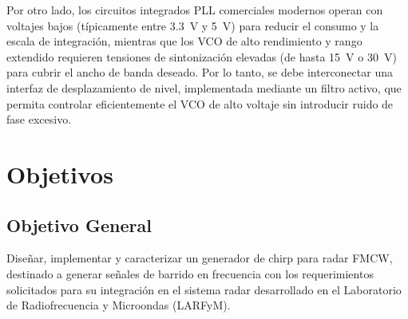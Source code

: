 Por otro lado, los circuitos integrados PLL comerciales modernos operan con voltajes bajos (típicamente entre 3.3~V y 5~V) para reducir el consumo y la escala de integración, mientras que los VCO de alto rendimiento y rango extendido requieren tensiones de sintonización elevadas (de hasta 15~V o 30~V) para cubrir el ancho de banda deseado. Por lo tanto, se debe interconectar una interfaz de desplazamiento de nivel, implementada mediante un filtro activo, que permita controlar eficientemente el VCO de alto voltaje sin introducir ruido de fase excesivo.

\section{Objetivos}

\subsection{Objetivo General}
Diseñar, implementar y caracterizar un generador de chirp para radar FMCW, destinado a generar señales de barrido en frecuencia con los requerimientos solicitados para su integración en el sistema radar desarrollado en el Laboratorio de Radiofrecuencia y Microondas (LARFyM).


